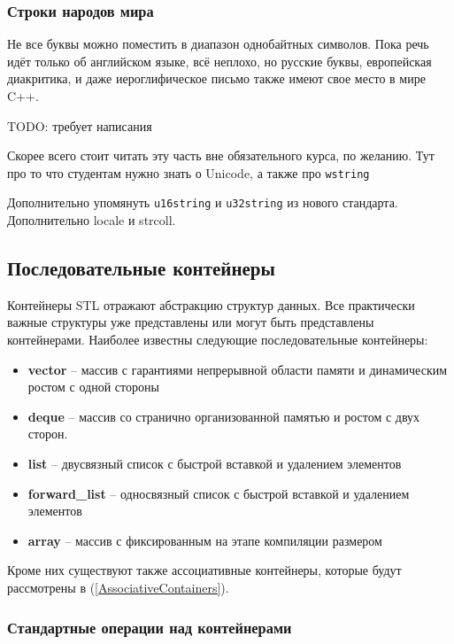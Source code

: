\documentclass[a4paper,12pt,oneside]{article}
\begin{document}
\subsubsection{Строки народов мира}

Не все буквы можно поместить в диапазон однобайтных символов. Пока речь идёт только об английском языке, всё неплохо, но русские буквы, европейская диакритика, и даже иероглифическое письмо также имеют свое место в мире C++.

TODO: требует написания

Скорее всего стоит читать эту часть вне обязательного курса, по желанию.
Тут про то что студентам нужно знать о Unicode, а также про \lstinline!wstring! 

Дополнительно упомянуть \lstinline!u16string! и \lstinline!u32string! из нового стандарта.
Дополнительно locale и strcoll.

\pagebreak
\subsection{Последовательные контейнеры}\label{SeqContainers}

Контейнеры STL отражают абстракцию структур данных. Все практически важные структуры уже представлены или могут быть представлены контейнерами. Наиболее известны следующие последовательные контейнеры:

\begin{itemize}
\item \textbf{vector} -- массив с гарантиями непрерывной области памяти и динамическим ростом с одной стороны
\item \textbf{deque} -- массив со странично организованной памятью и ростом с двух сторон.
\item \textbf{list} -- двусвязный список с быстрой вставкой и удалением элементов
\item \textbf{forward\_list} -- односвязный список с быстрой вставкой и удалением элементов
\item \textbf{array} -- массив с фиксированным на этапе компиляции размером
\end{itemize}

Кроме них существуют также ассоциативные контейнеры, которые будут рассмотрены в (\ref{AssociativeContainers}).

\subsubsection{Стандартные операции над контейнерами}\label{StandardOperations}
\end{document}

